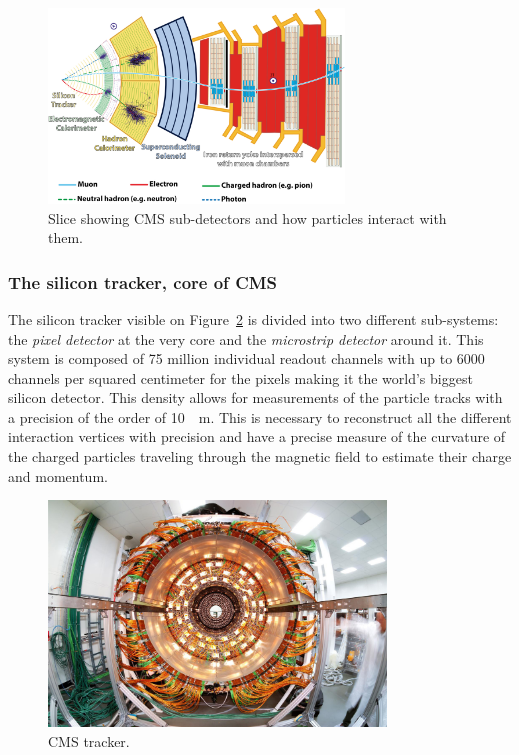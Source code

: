 	\begin{figure}[H]
		\centering
		\includegraphics[width=0.7\textwidth]{fig/chapt2/CMS_slice.png}
		\caption{\label{fig:CMS-slice} Slice showing CMS sub-detectors and how particles interact with them.}
	\end{figure}
	
		\subsubsection{The silicon tracker, core of CMS}
		\label{chapt2:sssec:tracker}
	
	The silicon tracker visible on Figure~\ref{fig:tracker} is divided into two different sub-systems: the \textit{pixel detector} at the very core and the \textit{microstrip detector} around it. This system is composed of 75 million individual readout channels with up to 6000 channels per squared centimeter for the pixels making it the world's biggest silicon detector. This density allows for measurements of the particle tracks with a precision of the order of \SI{10}{\mu m}. This is necessary to reconstruct all the different interaction vertices with precision and have a precise measure of the curvature of the charged particles traveling through the magnetic field to estimate their charge and momentum.
	
	\begin{figure}[H]
		\centering
		\includegraphics[height = 6cm]{fig/chapt2/Tracker.jpg}
		\caption{\label{fig:tracker} CMS tracker.}
	\end{figure}
	
